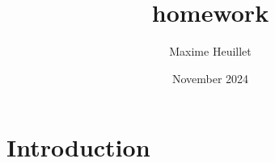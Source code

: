 \documentclass{article}
\title{homework}
\author{Maxime Heuillet}
\date{November 2024}
\begin{document}
\maketitle

\section{Introduction}
\end{document}
